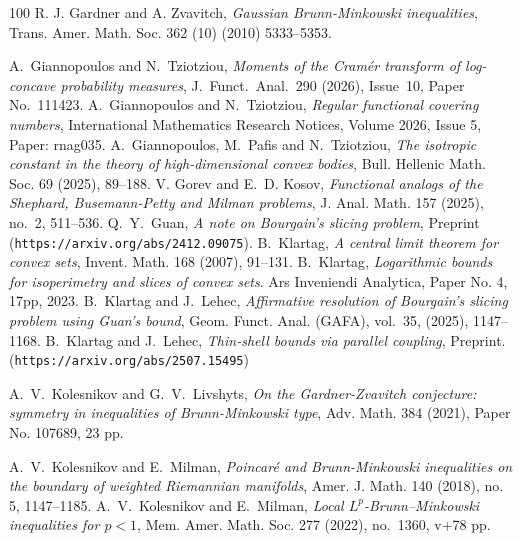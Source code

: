 \documentclass[11pt,leqno]{article}
\theoremstyle{definition}
\theoremstyle{remark}
\numberwithin{equation}{section}
\newcommand{\1}{\textbf{1}}
\begin{document}
\begin{thebibliography}{100}
 \textrm{R. J. Gardner and A. Zvavitch}, \textit{Gaussian Brunn-Minkowski inequalities},
Trans. Amer. Math. Soc. 362 (10) (2010) 5333--5353.

 \textrm{A.\ Giannopoulos and N.\ Tziotziou}, \textit{Moments of the Cram\'{e}r
transform of log-concave probability measures}, J.\ Funct.\ Anal.\ 290 (2026), Issue~10, Paper No.~111423. 
 \textrm{A.\ Giannopoulos and N.\ Tziotziou}, \textit{Regular functional covering numbers}, 
International Mathematics Research Notices, Volume 2026, Issue 5, Paper: rnag035.
 \textrm{A.\ Giannopoulos, M.\ Pafis and N.\ Tziotziou}, 
\textit{The isotropic constant in the theory of high-dimensional convex bodies}, Bull. Hellenic Math. Soc. 69 (2025), 89--188.
 \textrm{V. Gorev and E.~D. Kosov}, \textit{Functional analogs of the Shephard, Busemann-Petty and Milman problems}, J. Anal. Math. 157 (2025), no.~2, 511--536.
 \textrm{Q.~Y.~Guan}, \textit{A note on Bourgain's slicing problem}, Preprint ({\tt https://arxiv.org/abs/2412.09075}).
 \textrm{B.\ Klartag}, \textit{A central limit theorem for convex sets}, Invent. Math. {168} (2007), 91--131.
 \textrm{B.~Klartag}, \textit{Logarithmic bounds for isoperimetry and slices of convex sets}. Ars Inveniendi
Analytica, Paper No. 4, 17pp, 2023.
 \textrm{B.~Klartag and J.~Lehec}, \textit{Affirmative resolution of Bourgain's slicing problem using
Guan's bound}, Geom. Funct. Anal. (GAFA), vol.~35, (2025), 1147--1168.
 \textrm{B.~Klartag and J.~Lehec}, \textit{Thin-shell bounds via parallel coupling}, Preprint.\\ 
({\tt https://arxiv.org/abs/2507.15495})



 \textrm{A.\ V.\ Kolesnikov and G.\ V.\ Livshyts}, \textit{On the Gardner-Zvavitch conjecture: symmetry in inequalities of Brunn-Minkowski type}, 
Adv. Math. 384 (2021), Paper No. 107689, 23 pp.

 \textrm{A.\ V.\ Kolesnikov and E.\ Milman}, \textit{Poincar\'{e} and Brunn-Minkowski inequalities on the boundary of weighted Riemannian manifolds}, 
Amer. J. Math. 140 (2018), no. 5, 1147--1185. 
 \textrm{A.\ V.\ Kolesnikov and E.\ Milman}, \textit{Local $L^p$-Brunn--Minkowski inequalities for $p<1$}, 
Mem. Amer. Math. Soc. 277 (2022), no.~1360, v+78 pp. 


\end{thebibliography}
\end{document}
